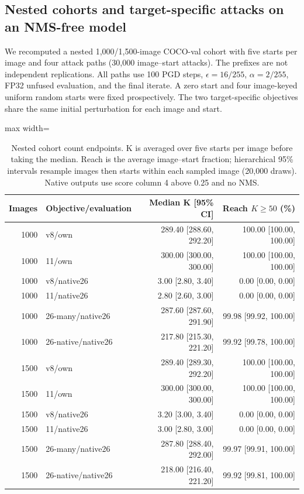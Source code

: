 \subsection{Nested cohorts and target-specific attacks on an NMS-free model}
\label{sec:nested1500}
We recomputed a nested 1,000/1,500-image COCO-val cohort with five starts per image and four attack paths (30,000 image--start attacks). The prefixes are not independent replications. All paths use 100 PGD steps, $\epsilon=16/255$, $\alpha=2/255$, FP32 unfused evaluation, and the final iterate. A zero start and four image-keyed uniform random starts were fixed prospectively. The two target-specific objectives share the same initial perturbation for each image and start.
\begin{table}[t]\centering\small
\caption{Nested cohort count endpoints. K is averaged over five starts per image before taking the median. Reach is the average image--start fraction; hierarchical 95\% intervals resample images then starts within each sampled image (20,000 draws). Native outputs use score column 4 above 0.25 and no NMS.}
\label{tab:nested1500}\begin{adjustbox}{max width=\textwidth}\begin{tabular}{rlrr}\hline
Images & Objective/evaluation & Median K [95\% CI] & Reach $K\geq50$ (\%)\\\hline
1000 & v8/own & 289.40 [288.60, 292.20] & 100.00 [100.00, 100.00]\\
1000 & 11/own & 300.00 [300.00, 300.00] & 100.00 [100.00, 100.00]\\
1000 & v8/native26 & 3.00 [2.80, 3.40] & 0.00 [0.00, 0.00]\\
1000 & 11/native26 & 2.80 [2.60, 3.00] & 0.00 [0.00, 0.00]\\
1000 & 26-many/native26 & 287.60 [287.60, 291.90] & 99.98 [99.92, 100.00]\\
1000 & 26-native/native26 & 217.80 [215.30, 221.20] & 99.92 [99.78, 100.00]\\
1500 & v8/own & 289.40 [289.30, 292.20] & 100.00 [100.00, 100.00]\\
1500 & 11/own & 300.00 [300.00, 300.00] & 100.00 [100.00, 100.00]\\
1500 & v8/native26 & 3.20 [3.00, 3.40] & 0.00 [0.00, 0.00]\\
1500 & 11/native26 & 3.00 [2.80, 3.00] & 0.00 [0.00, 0.00]\\
1500 & 26-many/native26 & 287.80 [288.40, 292.00] & 99.97 [99.91, 100.00]\\
1500 & 26-native/native26 & 218.00 [216.40, 221.20] & 99.92 [99.81, 100.00]\\
\hline\end{tabular}\end{adjustbox}\end{table}
